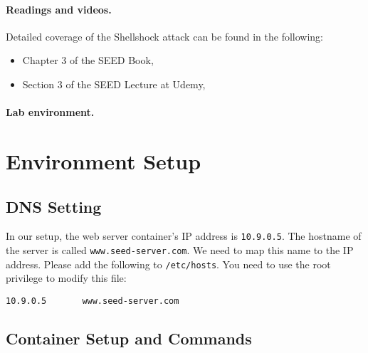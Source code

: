 \paragraph{Readings and videos.}
Detailed coverage of the Shellshock attack can be found in the following:

\begin{itemize}
\item Chapter 3 of the SEED Book, \seedbook
\item Section 3 of the SEED Lecture at Udemy, \seedcsvideo
\end{itemize}


\paragraph{Lab environment.} \seedenvironmentB \nodependency



\section{Environment Setup} 



\subsection{DNS Setting}

In our setup, the web server container's IP address is
\texttt{10.9.0.5}. The hostname of the server is called
\texttt{www.seed-server.com}. We need to map
this name to the IP address. Please add the following
to \texttt{/etc/hosts}. You need to use the root privilege
to modify this file: 

\begin{lstlisting}
10.9.0.5       www.seed-server.com
\end{lstlisting}
 


\subsection{Container Setup and Commands}




